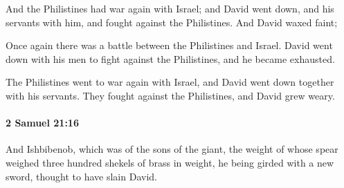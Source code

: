 			\begin{versebox}
					\item[BHS] 
					\item[ASV] And the Philistines had war again with Israel; and David went down, and his servants with him, and fought against the Philistines. And David waxed faint;
					\item[NIV] Once again there was a battle between the Philistines and Israel. David went down with his men to fight against the Philistines, and he became exhausted.
					\item[NRSV] The Philistines went to war again with Israel, and David went down together with his servants. They fought against the Philistines, and David grew weary.
			\end{versebox}

		\paragraph{2 Samuel 21:16} %
			\label{2SAMUEL-21-16}

			And Ishbibenob, which was of the sons of the giant, the weight of whose spear weighed three hundred shekels of brass in weight, he being girded with a new sword, thought to have slain David.


